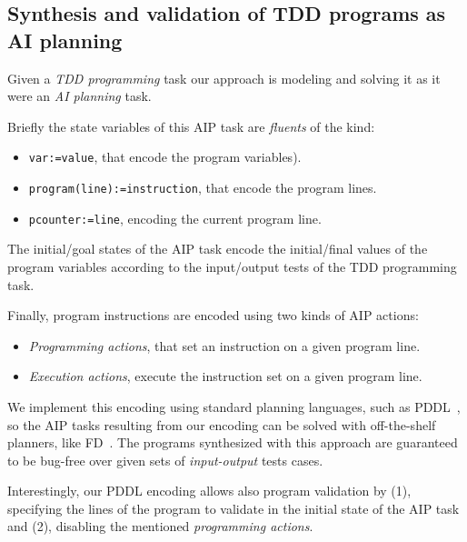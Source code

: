 \documentclass[10pt,a4paper]{paper}
\begin{document}
\subsection{Synthesis and validation of TDD programs as AI planning}
Given a {\em TDD programming} task our approach is modeling and solving it as it were an {\em AI planning} task.

Briefly the state variables of this AIP task are {\em fluents} of the kind:
\begin{itemize}
\item {\tt var:=value}, that encode the program variables).
\item {\tt program(line):=instruction}, that encode the program lines.
\item {\tt pcounter:=line}, encoding the current program line.
\end {itemize}

The initial/goal states of the AIP task encode the initial/final values of the program variables according to the input/output tests of the TDD programming task.

Finally, program instructions are encoded using two kinds of AIP actions:
\begin{itemize}
\item {\it Programming actions}, that set an instruction on a given program line.
\item {\it Execution actions}, execute the instruction set on a given program line.
\end{itemize}
We implement this encoding using standard planning languages, such as PDDL~\cite{fox2003pddl2}, so the AIP tasks resulting from our encoding can be solved with off-the-shelf planners, like {\sc FD}~\cite{helmert2006fast}. The programs synthesized with this approach are guaranteed to be bug-free over given sets of {\em input-output} tests cases.

Interestingly, our PDDL encoding allows also program validation by (1), specifying the lines of the program to validate in the initial state of the AIP task and (2), disabling the mentioned {\it programming actions}. 
\end{document}
